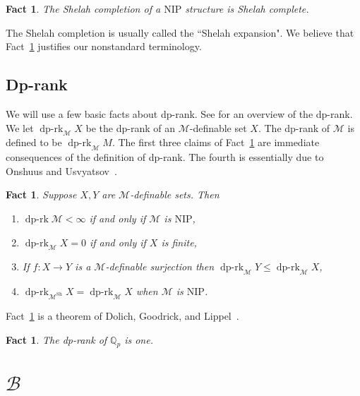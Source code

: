 \documentclass[bibalpha]{amsart}
\newcommand{\dprk}{\operatorname{dp-rk}}
\newtheorem{fact}[theorem]{Fact}
\theoremstyle{definition}
\theoremstyle{remark}
\newcommand{\Sh}[1]{\ensuremath{\mathscr{#1}^{\mathrm{Sh}}}}
\newcommand{\nip}{\mathrm{NIP}}
\newcommand{\Sa}[1]{\ensuremath{\mathscr{#1}}}
\newcommand{\Q}{\mathbb{Q}}
\begin{document}
\begin{fact}
\label{fact:completion-is-complete}
The Shelah completion of a $\nip$ structure is Shelah complete.
\end{fact}

\noindent
The Shelah completion is usually called the ``Shelah expansion".
We believe that Fact~\ref{fact:completion-is-complete} justifies our nonstandard terminology.

\subsection{Dp-rank}
We will use a few basic facts about dp-rank.
See \cite{Simon-Book} for an overview of the dp-rank.
We let $\dprk_{\Sa M} X$ be the dp-rank of an $\Sa M$-definable set $X$.
The dp-rank of $\Sa M$ is defined to be $\dprk_{\Sa M} M$.
The first three claims of Fact~\ref{fact:dp-rank} are immediate consequences of the definition of dp-rank.
The fourth is essentially due to Onshuus and Usvyatsov~\cite{OnUs}.

\begin{fact}
\label{fact:dp-rank}
Suppose $X,Y$ are $\Sa M$-definable sets.
Then
\begin{enumerate}
\item $\dprk \Sa M < \infty$ if and only if $\Sa M$ is $\nip$,
\item $\dprk_{\Sa M} X = 0$ if and only if $X$ is finite,
\item If $f : X \to Y$ is a $\Sa M$-definable surjection then $\dprk_{\Sa M} Y \leq \dprk_{\Sa M} X$,
\item $\dprk_{\Sh M} X = \dprk_{\Sa M} X$ when $\Sa M$ is $\nip$.
\end{enumerate}
\end{fact}

\noindent
Fact~\ref{fact:dp-qp} is a theorem of Dolich, Goodrick, and Lippel~\cite{dp-basic}.

\begin{fact}
\label{fact:dp-qp}
The dp-rank of $\Q_p$ is one.
\end{fact}

\section{$\Sa B$}
\end{document}
